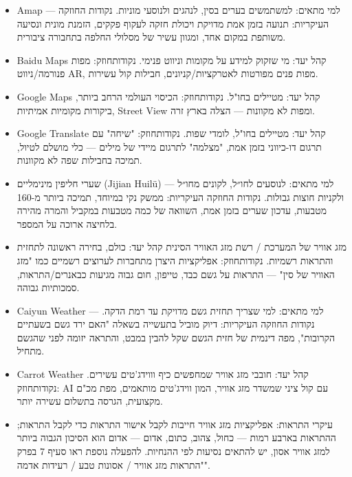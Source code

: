 
\begin{itemize}
  \item Amap — למי מתאים: למשתמשים בערים בסין, לנהגים ולנוסעי מוניות. נקודות החוזקה העיקריות: תנועה בזמן אמת מדויקת ויכולת חזקה לעקוף פקקים, הזמנת מונית ונסיעה משותפת במקום אחד, ומגוון עשיר של מסלולי החלפה בתחבורה ציבורית.
  \item Baidu Maps קהל יעד: מי שזקוק למידע על מקומות וניווט פנימי. נקודותחוזק: מפות פנורמה/ניווט AR, מפות פנים מפורטות לאטרקציות/קניונים, חבילות קול עשירות.
  \item Google Maps קהל יעד: מטיילים בחו"ל. נקודותחוזק: הכיסוי העולמי הרחב ביותר, ביקורות מקומיות אמיתיות, Street View ומפות לא מקוונות — הצלה בארץ זרה.
\end{itemize}


\begin{itemize}
  \item Google Translate קהל יעד: מטיילים בחו"ל, לומדי שפות. נקודותחוזק: "שיחה" עם תרגום דו-כיווני בזמן אמת, "מצלמה" לתרגום מיידי של מילים — כלי מושלם לטיול, תמיכה בחבילות שפה לא מקוונות.
\end{itemize}


\begin{itemize}
  \item שערי חליפין מינימליים (Jijian Huilü) — למי מתאים: לנוסעים לחו״ל, לקונים מחו״ל ולקניות חוצות גבולות. נקודות החוזקה העיקריות: ממשק נקי במיוחד, תמיכה ביותר מ-160 מטבעות, עדכון שערים בזמן אמת, השוואה של כמה מטבעות במקביל והמרה מהירה בלחיצה ארוכה על המספר.
\end{itemize}


\begin{itemize}
  \item מזג אוויר של המערכת / רשת מזג האוויר הסינית קהל יעד: כולם, בחירה ראשונה לתחזית והתראות רשמיות. נקודותחוזק: אפליקציות היצרן מתחברות לערוצים רשמיים כמו "מזג האוויר של סין" — התראות על גשם כבד, טייפון, חום גבוה מגיעות כבאנרים/התראות, סמכותיות גבוהה.
  \item Caiyun Weather — למי מתאים: למי שצריך תחזית גשם מדויקת עד רמת הדקה. נקודות החוזקה העיקריות: דיוק מוביל בתעשייה בשאלה "האם ירד גשם בשעתיים הקרובות", מפה דינמית של חזית הגשם שקל להבין במבט, והתראה יזומה לפני שהגשם מתחיל.
  \item Carrot Weather קהל יעד: חובבי מזג אוויר שמחפשים כיף וווידג'טים עשירים. נקודותחוזק: AI עם קול ציני שמשדר מזג אוויר, המון ווידג'טים מותאמים, מפת מכ"ם מקצועית, הגרסה בתשלום עשירה יותר.
  \item עיקרי התראות: אפליקציות מזג אוויר חייבות לקבל אישור התראות כדי לקבל התראות; ההתראות בארבע רמות — כחול, צהוב, כתום, אדום — אדום הוא הסיכון הגבוה ביותר למזג אוויר אסון, יש להתאים נסיעות לפי ההנחיות. להפעלה נוספת ראו סעיף 7 בפרק "התראות מזג אוויר / אסונות טבע / רעידות אדמה".
\end{itemize}

